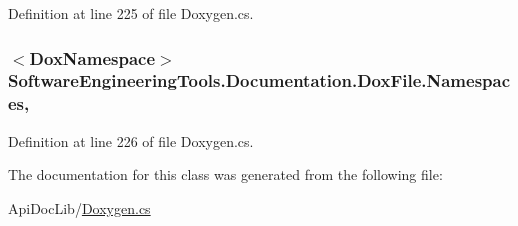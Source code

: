 Definition at line 225 of file Doxygen.\+cs.

\hypertarget{class_software_engineering_tools_1_1_documentation_1_1_dox_file_ac65f32ba25c936eb27093d7d0cd2d704}{
\subsubsection[{Namespaces}]{$<${\bf Dox\+Namespace}$>$ Software\+Engineering\+Tools.\+Documentation.\+Dox\+File.\+Namespaces\hspace{0.3cm}{\ttfamily [get]}, {\ttfamily [set]}}}\label{class_software_engineering_tools_1_1_documentation_1_1_dox_file_ac65f32ba25c936eb27093d7d0cd2d704}


Definition at line 226 of file Doxygen.\+cs.



The documentation for this class was generated from the following file\+:\begin{DoxyCompactItemize}
\item 
Api\+Doc\+Lib/\hyperlink{_doxygen_8cs}{Doxygen.\+cs}\end{DoxyCompactItemize}
